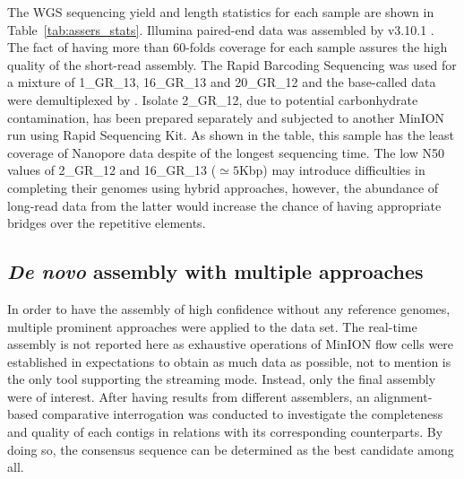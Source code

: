 The WGS sequencing yield and length statistics for each sample are shown in Table~\ref{tab:assers_stats}. 
Illumina paired-end data was assembled by \spades{} v3.10.1 \cite{BankevichNA2012}. The fact of having more than 60-folds coverage for each sample assures the high quality of the short-read assembly.
The Rapid Barcoding Sequencing was used for a mixture of 1\_GR\_13, 16\_GR\_13 and 20\_GR\_12 and the base-called data were demultiplexed by \npbarcode{}. Isolate 2\_GR\_12, due to potential carbonhydrate contamination, has been prepared separately and subjected to another MinION run using Rapid Sequencing Kit. As shown in the table, this sample has the least coverage of Nanopore data despite of the longest sequencing time. The low N50 values of 2\_GR\_12 and 16\_GR\_13 ($\simeq 5$Kbp) may introduce difficulties in completing their genomes using hybrid approaches, however, the abundance of long-read data from the latter would increase the chance of having appropriate bridges over the repetitive elements.
\subsection{\emph{De novo} assembly with multiple approaches}
In order to have the assembly of high confidence without any reference genomes, multiple prominent approaches were applied to the data set. 
The real-time assembly is not reported here as exhaustive operations of MinION flow cells were established in expectations to obtain as much data as possible, not to mention \npscarf{} is the only tool supporting the streaming mode. Instead, only the final assembly were of interest. 
After having results from different assemblers, an alignment-based comparative interrogation was conducted to investigate the completeness and quality of each contigs in relations with its corresponding counterparts.
By doing so, the consensus sequence can be determined as the best candidate among all.

